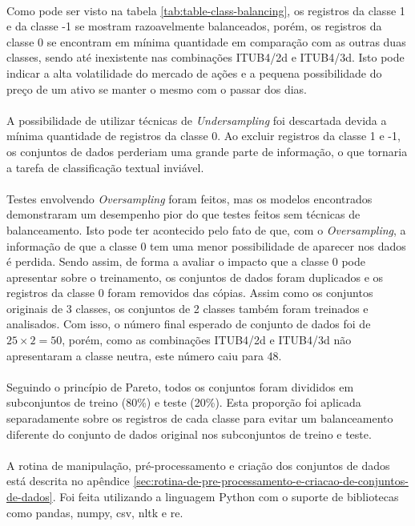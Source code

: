 \documentclass[grad,numbers]{coppe}
\begin{document}
  		\paragraph{}Como pode ser visto na tabela \ref{tab:table-class-balancing}, os registros da classe 1 e da classe -1 se mostram razoavelmente balanceados, porém, os registros da classe 0 se encontram em mínima quantidade em comparação com as outras duas classes, sendo até inexistente nas combinações ITUB4/2d e ITUB4/3d. Isto pode indicar a alta volatilidade do mercado de ações e a pequena possibilidade do preço de um ativo se manter o mesmo com o passar dos dias.
  		\paragraph{}A possibilidade de utilizar técnicas de \textit{Undersampling} foi descartada devida a mínima quantidade de registros da classe 0. Ao excluir registros da classe 1 e -1, os conjuntos de dados perderiam uma grande parte de informação, o que tornaria a tarefa de classificação textual inviável.
  		\paragraph{}Testes envolvendo \textit{Oversampling} foram feitos, mas os modelos encontrados demonstraram um desempenho pior do que testes feitos sem técnicas de balanceamento. Isto pode ter acontecido pelo fato de que, com o \textit{Oversampling}, a informação de que a classe 0 tem uma menor possibilidade de aparecer nos dados é perdida. Sendo assim, de forma a avaliar o impacto que a classe 0 pode apresentar sobre o treinamento, os conjuntos de dados foram duplicados e os registros da classe 0 foram removidos das cópias. Assim como os conjuntos originais de 3 classes, os conjuntos de 2 classes também foram treinados e analisados. Com isso, o número final esperado de conjunto de dados foi de $25\times2=50$, porém, como as combinações ITUB4/2d e ITUB4/3d não apresentaram a classe neutra, este número caiu para 48.
  		\paragraph{}Seguindo o princípio de Pareto, todos os conjuntos foram divididos em subconjuntos de treino (80\%) e teste (20\%). Esta proporção foi aplicada separadamente sobre os registros de cada classe para evitar um balanceamento diferente do conjunto de dados original nos subconjuntos de treino e teste.
  		\paragraph{}A rotina de manipulação, pré-processamento e criação dos conjuntos de dados está descrita no apêndice \ref{sec:rotina-de-pre-processamento-e-criacao-de-conjuntos-de-dados}. Foi feita utilizando a linguagem Python com o suporte de bibliotecas como pandas, numpy, csv, nltk e re.
  		
\end{document}
